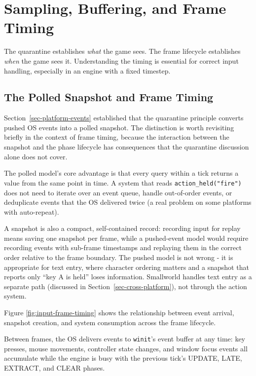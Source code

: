 \documentclass[
  11pt,
  letterpaper,
  DIV=11,
  numbers=noendperiod,
  twoside,
  open=right]{scrreprt}
\begin{document}
\section{Sampling, Buffering, and Frame
Timing}\label{sampling-buffering-and-frame-timing}

The quarantine establishes \emph{what} the game sees. The frame
lifecycle establishes \emph{when} the game sees it. Understanding the
timing is essential for correct input handling, especially in an engine
with a fixed timestep.

\subsection{The Polled Snapshot and Frame
Timing}\label{the-polled-snapshot-and-frame-timing}

Section~\ref{sec-platform-events} established that the quarantine
principle converts pushed OS events into a polled snapshot. The
distinction is worth revisiting briefly in the context of frame timing,
because the interaction between the snapshot and the phase lifecycle has
consequences that the quarantine discussion alone does not cover.

The polled model's core advantage is that every query within a tick
returns a value from the same point in time. A system that reads
\texttt{action\_held("fire")} does not need to iterate over an event
queue, handle out-of-order events, or deduplicate events that the OS
delivered twice (a real problem on some platforms with auto-repeat).

A snapshot is also a compact, self-contained record: recording input for
replay means saving one snapshot per frame, while a pushed-event model
would require recording events with sub-frame timestamps and replaying
them in the correct order relative to the frame boundary. The pushed
model is not wrong - it is appropriate for text entry, where character
ordering matters and a snapshot that reports only ``key A is held''
loses information. Smallworld handles text entry as a separate path
(discussed in Section~\ref{sec-cross-platform}), not through the action
system.

Figure \ref{fig:input-frame-timing} shows the relationship between event
arrival, snapshot creation, and system consumption across the frame
lifecycle.

Between frames, the OS delivers events to \texttt{winit}'s event buffer
at any time: key presses, mouse movements, controller state changes, and
window focus events all accumulate while the engine is busy with the
previous tick's UPDATE, LATE, EXTRACT, and CLEAR phases.
\end{document}
